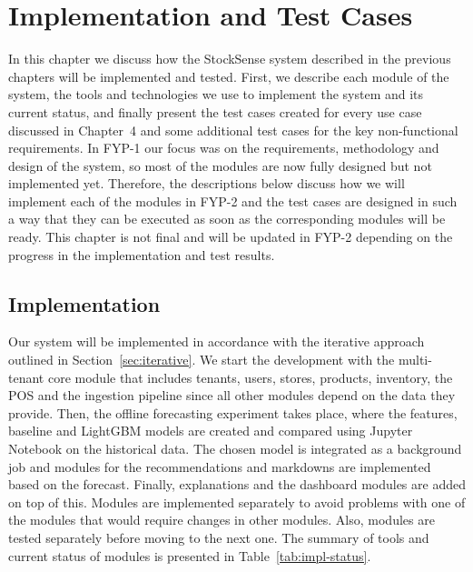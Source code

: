 \documentclass{StockSense}
\begin{document}


\chapter{Implementation and Test Cases}

In this chapter we discuss how the StockSense system described in the previous chapters will be implemented and tested. First, we describe each module of the system, the tools and technologies we use to implement the system and its current status, and finally present the test cases created for every use case discussed in Chapter~4 and some additional test cases for the key non-functional requirements. In FYP-1 our focus was on the requirements, methodology and design of the system, so most of the modules are now fully designed but not implemented yet. Therefore, the descriptions below discuss how we will implement each of the modules in FYP-2 and the test cases are designed in such a way that they can be executed as soon as the corresponding modules will be ready. This chapter is not final and will be updated in FYP-2 depending on the progress in the implementation and test results.

\section{Implementation}

Our system will be implemented in accordance with the iterative approach outlined in Section~\ref{sec:iterative}. We start the development with the multi-tenant core module that includes tenants, users, stores, products, inventory, the POS and the ingestion pipeline since all other modules depend on the data they provide. Then, the offline forecasting experiment takes place, where the features, baseline and LightGBM models are created and compared using Jupyter Notebook on the historical data. The chosen model is integrated as a background job and modules for the recommendations and markdowns are implemented based on the forecast. Finally, explanations and the dashboard modules are added on top of this. Modules are implemented separately to avoid problems with one of the modules that would require changes in other modules. Also, modules are tested separately before moving to the next one. The summary of tools and current status of modules is presented in Table~\ref{tab:impl-status}.
\end{document}
